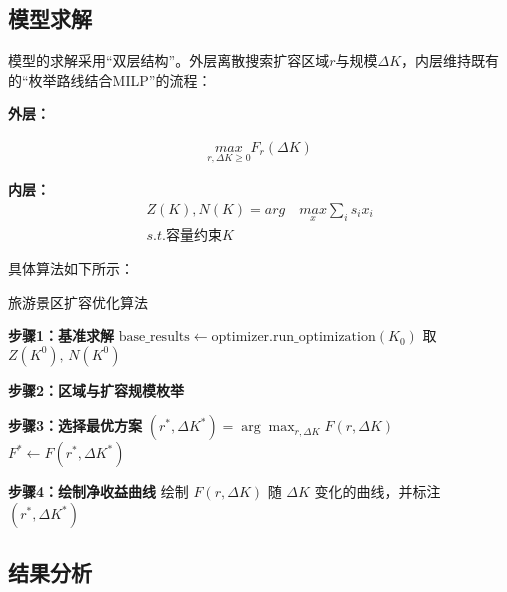 \subsection[\hspace{-2pt}模型求解]{{\heiti{}\hspace{-8pt}模型求解}}\label{subsec:3-model-build}

模型的求解采用“双层结构”。外层离散搜索扩容区域$r$与规模$\Delta K$，内层维持既有的“枚举路线结合MILP”的流程：

\noindent\textbf{外层：}

\begin{equation}
  \begin{aligned}
    \underset{r,\Delta K \geq 0}{max} F_{r}(\Delta K)
  \end{aligned}
\end{equation}

\noindent\textbf{内层：}
\begin{equation}
  \begin{aligned}
    Z(K),N(K)=arg\quad \underset{x}{max} \sum_{i}s_{i}x_{i}\\
    s.t. \text{容量约束}K
  \end{aligned}
\end{equation}

具体算法如下所示：

\begin{algorithm}[H]\small
  \renewcommand{\algorithmcfname}{算法}
  \caption{旅游景区扩容优化算法}


  \textbf{步骤1：基准求解}\;
  $\text{base\_results}\leftarrow\text{optimizer.run\_optimization}(K_0)$\;
  取 $Z(K^0),\,N(K^0)$\;

  \textbf{步骤2：区域与扩容规模枚举}\;

  \textbf{步骤3：选择最优方案}\;
  $(r^*,\Delta K^*) = \arg\max_{r,\Delta K} F(r,\Delta K)$\;
  $F^* \leftarrow F(r^*,\Delta K^*)$\;

  \textbf{步骤4：绘制净收益曲线}\;
  绘制 $F(r,\Delta K)$ 随 $\Delta K$ 变化的曲线，并标注 $(r^*,\Delta K^*)$\;

  \label{algorithm:expansion_optimization}
\end{algorithm}

\subsection[\hspace{-2pt}结果分析]{{\heiti{}\hspace{-8pt}结果分析}}\label{subsec:3-model-build}
